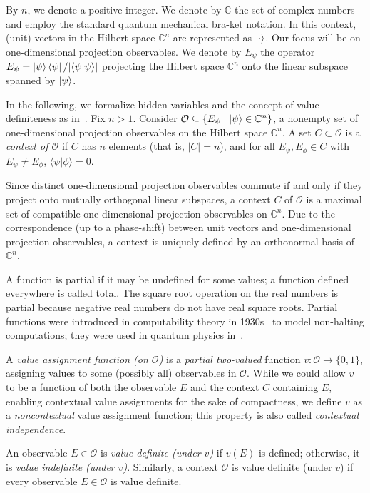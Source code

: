 \documentclass[%
 superscriptaddress,
  preprint,
 showpacs,
 showkeys,
 nofootinbib,
  amsmath,amssymb,
 pra,
  longbibliography,
  floatfix,
 ]{revtex4-2}
\theoremstyle{definition}
\newcommand{\C}{\mathbb{C}}
\newcommand{\iprod}[2]{\langle #1 | #2 \rangle}
\begin{document}
By $n$, we denote a positive integer.
We denote by $\C$ the set of complex numbers and employ the standard quantum mechanical bra-ket notation. In this context, (unit) vectors in the Hilbert space $\C^n$ are represented as $\ket{\cdot}$.
Our focus will be on one-dimensional projection observables.
We denote by $E_\psi$ the operator $E_\psi=\ket{\psi}\bra{\psi}/\vert \iprod{\psi}{\psi}\vert$ projecting the Hilbert space $\C^n$ onto the linear subspace spanned by $\ket{\psi}$.


In the following, we formalize hidden variables and the concept of value definiteness as in~\cite{2015-AnalyticKS}.
Fix $n>1$. Consider $\mathcal{O} \subseteq \{ E_\psi \mid \ket{\psi} \in \mathbb{C}^n \}$, a nonempty set of one-dimensional projection observables on the Hilbert space $\mathbb{C}^n$.
        A set $C \subset \mathcal{O}$ is a {\it context of $\mathcal{O}$} if $C$ has $n$ elements (that is, $|C|=n$), and for all $E_\psi, E_\phi \in C$ with $E_\psi \neq E_\phi$, $\iprod{\psi}{\phi}=0$.


Since distinct one-dimensional projection observables commute if and only if they project onto mutually orthogonal linear subspaces, a context $C$ of $\mathcal{O}$ is a maximal set of compatible one-dimensional projection observables on $\C^n$. Due to the correspondence (up to a phase-shift) between unit vectors and one-dimensional projection observables, a context is uniquely defined by an orthonormal basis of $\C^n$.

A function is partial if it may be undefined for some values; a function
defined everywhere is called total. The square root operation on the real numbers is partial
 because negative real numbers do not have real square roots.
Partial functions were introduced in
computability theory in 1930s~\cite{davis-58}%
to model non-halting computations; they were used in quantum physics in~\cite{2012-incomput-proofsCJ}.

        A {\it value assignment function (on $\mathcal{O}$)} is a {\it partial two-valued} function $v: \mathcal{O} \to \{0,1\}$,
assigning values to some (possibly all) observables in $\mathcal{O}$.
While we could allow $v$ to be a function of both the observable $E$ and the context $C$ containing $E$,
enabling contextual value assignments for the sake of compactness,
we define $v$ as a {\it noncontextual} value assignment function; this property is also called {\it contextual independence}.

        An observable $E \in \mathcal{O}$ is {\it value definite (under $v$)} if $v(E)$ is defined;
otherwise, it is {\it value indefinite (under $v$)}.
Similarly, a context $\mathcal{O}$ is value definite (under $v$) if every observable $E \in \mathcal{O}$ is value definite.
\end{document}
